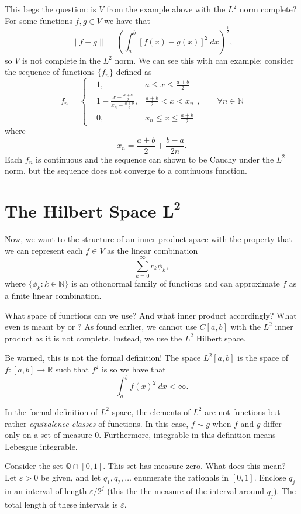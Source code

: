 \documentclass[11pt]{article}
\theoremstyle{definition}
\newcommand{\R}{\mathbb{R}}                      %
\newcommand{\Q}{\mathbb{Q}}
\newcommand{\N}{\mathbb{N}}
\begin{document}
This begs the question: is $V$ from the example above with the $L^2$ norm complete? For some functions $f,g\in V$ we have that
$$
\|f-g\| = \left( \int_a^b [f(x)-g(x)]^2 ~dx \right)^\frac{1}{2},
$$
so $V$ is not complete in the $L^2$ norm. We can see this with can example: consider the sequence of functions $\{f_n\}$ defined as
$$
f_n=\left\{ \begin{aligned}
&1, &a\leq x \leq \frac{a+b}{2}\\
&1 - \frac{x-\frac{a+b}{2}}{x_n - \frac{a+b}{2}}, &\frac{a+b}{2}< x < x_n\\
&0, & x_n \leq x\leq \frac{a+b}{2}
\end{aligned}, \qquad \forall n\in\N
\right.
$$
where 
$$x_n=\frac{a+b}{2}+\frac{b-a}{2n}.$$
Each $f_n$ is continuous and the sequence can shown to be Cauchy under the $L^2$ norm, but the sequence does not converge to a continuous function.
\section{The Hilbert Space $\mathbf{L}^\mathbf{2}$}
Now, we want to the structure of an inner product space with the property that we can represent each $f\in V$ as the linear combination
    $$
    \sum_{k=0}^\infty c_k\phi_k,
    $$
    where $\{\phi_k:k\in\N \}$ is an othonormal family of functions and can approximate $f$ as a finite linear combination.

What space of functions can we use? And what inner product accordingly? What even is meant by  or ? As found earlier, we cannot use $C[a,b]$ with the $L^2$ inner product as it is not complete. Instead, we use the $L^2$ Hilbert space.

\begin{mdframed}[backgroundcolor = blue!10]
\vspace{+0.1cm}
 Be warned, this is not the formal definition! The space $L^2[a,b]$ is the space of  $f:[a,b]\to \R$ such that $f^2$ is  so we have that
$$
\int_a^b f(x)^2~dx<\infty.
$$
\end{mdframed}
\note In the formal definition of $L^2$ space, the elements of $L^2$ are not functions but rather \textit{equivalence classes} of functions. In this case, $f\sim g$ when $f$ and $g$ differ only on a set of measure $0$. Furthermore, integrable in this definition means Lebesgue integrable.

\ex Consider the set $\Q\cap [0,1]$. This set has measure zero. What does this mean? Let $\varepsilon>0$ be given, and let $q_1,q_2, \dots$ enumerate the rationals in $[0,1]$. Enclose $q_j$ in an interval of length $\varepsilon/2^j$ (this the the measure of the interval around $q_j$). The total length of these intervals is $\varepsilon$.
\end{document}

